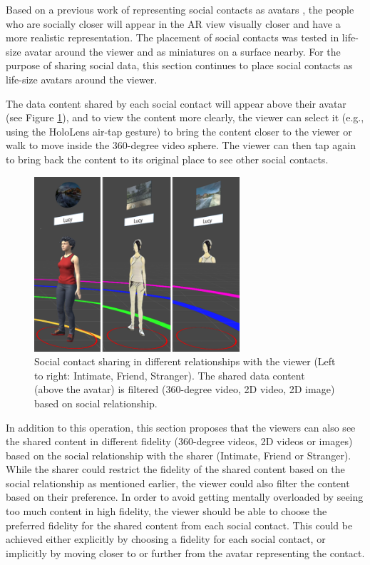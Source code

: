 Based on a previous work of representing social contacts as avatars \cite{Nassani2017a}, the people who are socially closer will appear in the AR view visually closer and have a more realistic representation. The placement of social contacts was tested in life-size avatar around the viewer and as miniatures on a surface nearby. For the purpose of sharing social data, this section continues to place social contacts as life-size avatars around the viewer. 

The data content shared by each social contact will appear above their avatar (see Figure \ref{fig:data:viewer}), and to view the content more clearly, the viewer can select it (e.g., using the HoloLens air-tap gesture) to bring the content closer to the viewer or walk to move inside the 360-degree video sphere. The viewer can then tap again to bring back the content to its original place to see other social contacts. 

\begin{figure}[H]
    \centering
    \includegraphics[width=3in]{images/chi/3_levels_of_data.png}
    \caption{Social contact sharing in different relationships with the viewer (Left to right: Intimate, Friend, Stranger). The shared data content (above the avatar) is filtered (360-degree video, 2D video, 2D image) based on social relationship.}
      \label{fig:data:viewer}
\end{figure}

In addition to this operation, this section proposes that the viewers can also see the shared content in different fidelity (360-degree videos, 2D videos or images) based on the social relationship with the sharer (Intimate, Friend or Stranger). While the sharer could restrict the fidelity of the shared content based on the social relationship as mentioned earlier, the viewer could also filter the content based on their preference. In order to avoid getting mentally overloaded by seeing too much content in high fidelity, the viewer should be able to choose the preferred fidelity for the shared content from each social contact. This could be achieved either explicitly by choosing a fidelity for each social contact, or implicitly by moving closer to or further from the avatar representing the contact.

